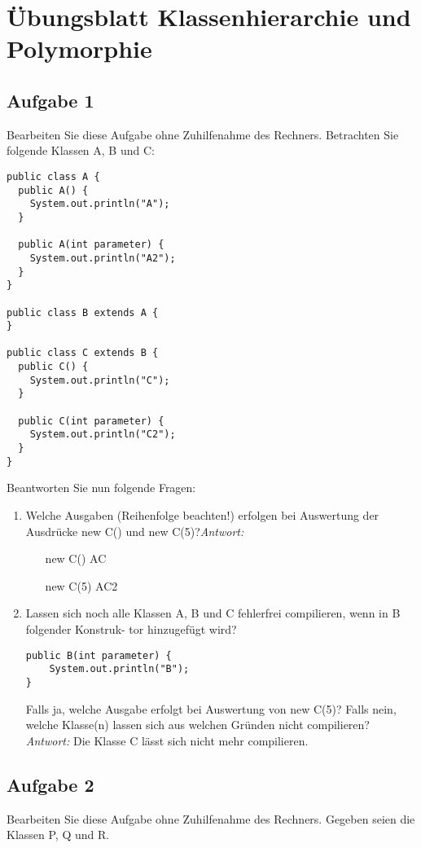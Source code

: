 \chapter{Übungsblatt Klassenhierarchie und Polymorphie}

\section{Aufgabe 1}
Bearbeiten Sie diese Aufgabe ohne Zuhilfenahme des Rechners. Betrachten Sie
folgende Klassen A, B und C:

\begin{lstlisting}
public class A {
  public A() {
    System.out.println("A");
  }

  public A(int parameter) {
    System.out.println("A2");
  }
}

public class B extends A {
}

public class C extends B {
  public C() {
    System.out.println("C");
  }

  public C(int parameter) {
    System.out.println("C2");
  }
}
\end{lstlisting}

Beantworten Sie nun folgende Fragen:

\begin{enumerate}
    \item Welche Ausgaben (Reihenfolge beachten!) erfolgen bei Auswertung der Ausdrücke
          new C() und new C(5)?\newline \textit{Antwort:} \begin{itemize}
              \item[new C()] AC
              \item[new C(5)] AC2
          \end{itemize} \pagebreak
    \item Lassen sich noch alle Klassen A, B und C fehlerfrei compilieren, wenn in B
          folgender Konstruk- tor hinzugefügt wird?
          \begin{lstlisting}
public B(int parameter) {
    System.out.println("B");
}
            \end{lstlisting}
          Falls ja, welche Ausgabe erfolgt bei Auswertung von new C(5)? Falls nein,
          welche Klasse(n) lassen sich aus welchen Gründen nicht compilieren?\newline
          \textit{Antwort:} Die Klasse C lässt sich nicht mehr compilieren.
\end{enumerate}

\section{Aufgabe 2}
Bearbeiten Sie diese Aufgabe ohne Zuhilfenahme des Rechners. Gegeben seien die
Klassen P, Q und R.

